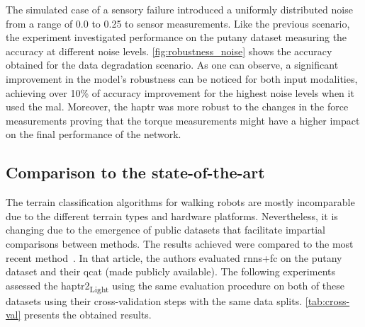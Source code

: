 \documentclass[a4paper, 10pt, twoside]{report}
\begin{document}
The simulated case of a sensory failure introduced a uniformly distributed noise from a range of 0.0 to 0.25 to sensor measurements. Like the previous scenario, the experiment investigated performance on the \acrshort{putany} dataset measuring the accuracy at different noise levels. \Figure\ref{fig:robustness_noise} shows the accuracy obtained for the data degradation scenario. As one can observe, a significant improvement in the model's robustness can be noticed for both input modalities, achieving over 10\% of accuracy improvement for the highest noise levels when it used the \acrshort{mal}. Moreover, the \acrshort{haptr} was more robust to the changes in the force measurements proving that the torque measurements might have a higher impact on the final performance of the network.

\subsection{Comparison to the state-of-the-art}
\label{part:experiments:terrain:sotacomparison}

The terrain classification algorithms for walking robots are mostly incomparable due to the different terrain types and hardware platforms. Nevertheless, it is changing due to the emergence of public datasets that facilitate impartial comparisons between methods. The results achieved were compared to the most recent method~\cite{Ahmadi2021}. In that article, the authors evaluated \acrshort{rnn}s+\acrshort{fc} on the \acrshort{putany} dataset and their \acrshort{qcat} (made publicly available). The following experiments assessed the \acrshort{haptr}2\textsubscript{Light} using the same evaluation procedure on both of these datasets using their cross-validation steps with the same data splits. \Figure\ref{tab:cross-val} presents the obtained results.
\end{document}
